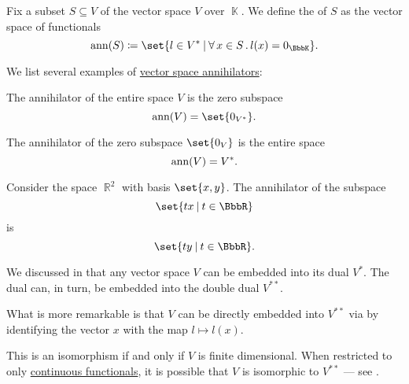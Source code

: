 \begin{definition}\label{def:vector_space_annihilator}
  Fix a subset \( S \subseteq V \) of the vector space \( V \) over \( \BbbK \). We define the  of \( S \) as the vector space of functionals
  \begin{equation*}
    \op{ann}(S) \coloneqq \set{ l \in V^* \given \qforall {x \in S} l(x) = 0_\BbbK }.
  \end{equation*}
\end{definition}

\begin{example}\label{ex:def:vector_space_annihilator}
  We list several examples of \hyperref[def:vector_space_annihilator]{vector space annihilators}:
  \begin{thmenum}
     The annihilator of the entire space \( V \) is the zero subspace
    \begin{equation*}
      \op{ann}(V) = \set{ 0_{V^*} }.
    \end{equation*}

     The annihilator of the zero subspace \( \set{ 0_V } \) is the entire space
    \begin{equation*}
      \operatorname{ann}(V) = V^*.
    \end{equation*}

     Consider the space \( \BbbR^2 \) with basis \( \set{ x, y } \). The annihilator of the subspace
    \begin{equation*}
      \set{ tx \given t \in \BbbR }
    \end{equation*}
    is
    \begin{equation*}
      \set{ ty \given t \in \BbbR }.
    \end{equation*}
  \end{thmenum}
\end{example}

\begin{remark}\label{rem:double_dual}
  We discussed in  that any vector space \( V \) can be embedded into its dual \( V^* \). The dual can, in turn, be embedded into the double dual \( V^{**} \).

  What is more remarkable is that \( V \) can be directly embedded into \( V^{**} \) via by identifying the vector \( x \) with the map \( l \mapsto l(x) \).

  This is an isomorphism if and only if \( V \) is finite dimensional. When restricted to only \hyperref[def:continuous_dual_space]{continuous functionals}, it is possible that \( V \) is isomorphic to \( V^{**} \) --- see .
\end{remark}
